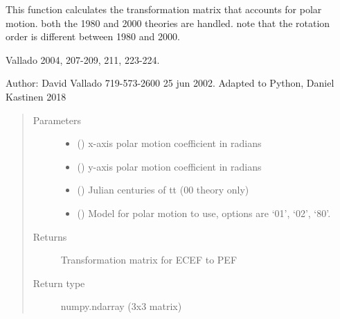 \documentclass[letterpaper,10pt,english]{sphinxmanual}
\begin{document}
\begin{fulllineitems}
\label{\detokenize{modules/propagator_sgp4:propagator_sgp4.polarm}}
This function calculates the transformation matrix that accounts for polar motion. both the 1980 and 2000 theories are handled. note that the rotation order is different between 1980 and 2000.

 Vallado 2004, 207-209, 211, 223-224.

Author: David Vallado 719-573-2600   25 jun 2002.
Adapted to Python, Daniel Kastinen 2018
\begin{quote}\begin{description}
\item[{Parameters}] \leavevmode\begin{itemize}
\item {} 
 () \textendash{} x-axis polar motion coefficient in radians

\item {} 
 () \textendash{} y-axis polar motion coefficient in radians

\item {} 
 () \textendash{} Julian centuries of tt (00 theory only)

\item {} 
 () \textendash{} Model for polar motion to use, options are ‘01’, ‘02’, ‘80’.

\end{itemize}

\item[{Returns}] \leavevmode
Transformation matrix for ECEF to PEF

\item[{Return type}] \leavevmode
numpy.ndarray (3x3 matrix)

\end{description}\end{quote}

\end{fulllineitems}
\end{document}
